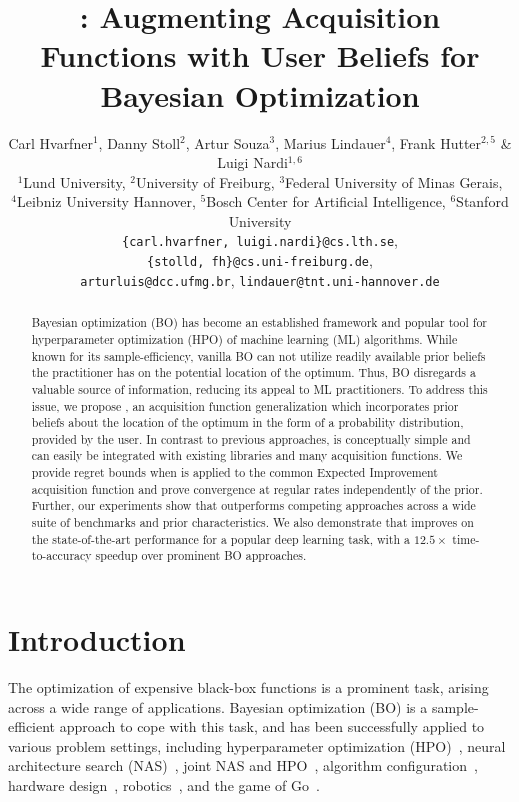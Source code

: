 \documentclass{article}
\title{\methodtwo: Augmenting Acquisition Functions with User Beliefs for Bayesian Optimization}
\author{%
  Carl Hvarfner$^1$, Danny Stoll$^2$, Artur Souza$^3$, Marius Lindauer$^4$, Frank Hutter$^{2,5}$ \& Luigi Nardi$^{1,6}$\\
  $^1$Lund University, $^2$University of Freiburg, $^3$Federal University of Minas Gerais,\\ $^4$Leibniz University Hannover, $^5$Bosch Center for Artificial Intelligence, $^6$Stanford University\\\texttt{\{carl.hvarfner, luigi.nardi\}@cs.lth.se},\\\texttt{\{stolld, fh\}@cs.uni-freiburg.de},\\ \texttt{arturluis@dcc.ufmg.br}, \texttt{lindauer@tnt.uni-hannover.de}}
\newcommand{\danny}[1]{\todo[color=red]{Danny: #1}}
\newcommand{\method}[0]{\text{${\pi}$BO}\xspace}
\begin{document}
\maketitle

\begin{abstract}
Bayesian optimization (BO) has become an established framework and popular tool for hyperparameter optimization (HPO) of machine learning (ML) algorithms. While known for its sample-efficiency, vanilla BO can not utilize readily available prior beliefs the practitioner has on the potential location of the optimum.  Thus, BO disregards a valuable source of information, reducing its appeal to ML practitioners. To address this issue, we propose \method, an acquisition function generalization which incorporates prior beliefs about the location of the optimum in the form of a probability distribution, provided by the user. In contrast to previous approaches, \method is conceptually simple and can easily be integrated with existing libraries and many acquisition functions. We provide regret bounds when \method is applied to the common Expected Improvement acquisition function and prove convergence at regular rates independently of the prior. Further, our experiments show that \method outperforms competing approaches across a wide suite of benchmarks and prior characteristics. We also demonstrate that \method improves on the state-of-the-art performance for a popular deep learning task, with a $12.5\times$ time-to-accuracy speedup over prominent BO approaches.

\end{abstract}

\section{Introduction} \label{intro}
The optimization of expensive black-box functions is a prominent task, arising across a wide range of applications. Bayesian optimization (BO) is a  sample-efficient approach to cope with this task, and has been successfully applied to various problem settings, including hyperparameter optimization (HPO)~\citep{snoek-nips12a}, neural architecture search (NAS)~\citep{ru2021interpretable}, joint NAS and HPO~\citep{zimmer-tpami21a}, algorithm configuration~\citep{smac},
 hardware design~\citep{nardi2019practical}, robotics~\citep{calandra-lion14a}, and the game of Go~\citep{Chen2018BayesianOI}.
\end{document}
